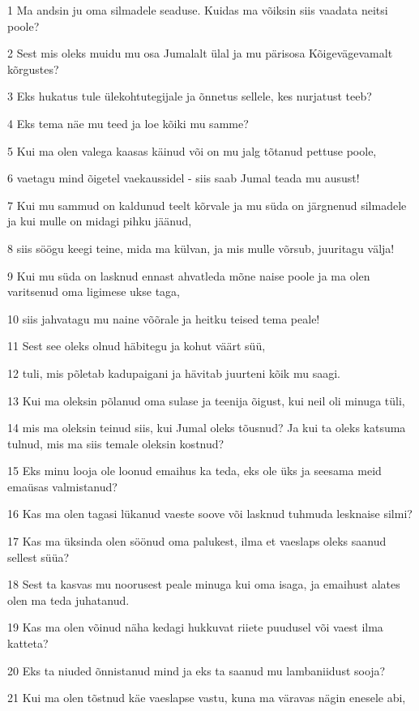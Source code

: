 \par 1 Ma andsin ju oma silmadele seaduse. Kuidas ma võiksin siis vaadata neitsi poole?
\par 2 Sest mis oleks muidu mu osa Jumalalt ülal ja mu pärisosa Kõigevägevamalt kõrgustes?
\par 3 Eks hukatus tule ülekohtutegijale ja õnnetus sellele, kes nurjatust teeb?
\par 4 Eks tema näe mu teed ja loe kõiki mu samme?
\par 5 Kui ma olen valega kaasas käinud või on mu jalg tõtanud pettuse poole,
\par 6 vaetagu mind õigetel vaekaussidel - siis saab Jumal teada mu ausust!
\par 7 Kui mu sammud on kaldunud teelt kõrvale ja mu süda on järgnenud silmadele ja kui mulle on midagi pihku jäänud,
\par 8 siis söögu keegi teine, mida ma külvan, ja mis mulle võrsub, juuritagu välja!
\par 9 Kui mu süda on lasknud ennast ahvatleda mõne naise poole ja ma olen varitsenud oma ligimese ukse taga,
\par 10 siis jahvatagu mu naine võõrale ja heitku teised tema peale!
\par 11 Sest see oleks olnud häbitegu ja kohut väärt süü,
\par 12 tuli, mis põletab kadupaigani ja hävitab juurteni kõik mu saagi.
\par 13 Kui ma oleksin põlanud oma sulase ja teenija õigust, kui neil oli minuga tüli,
\par 14 mis ma oleksin teinud siis, kui Jumal oleks tõusnud? Ja kui ta oleks katsuma tulnud, mis ma siis temale oleksin kostnud?
\par 15 Eks minu looja ole loonud emaihus ka teda, eks ole üks ja seesama meid emaüsas valmistanud?
\par 16 Kas ma olen tagasi lükanud vaeste soove või lasknud tuhmuda lesknaise silmi?
\par 17 Kas ma üksinda olen söönud oma palukest, ilma et vaeslaps oleks saanud sellest süüa?
\par 18 Sest ta kasvas mu noorusest peale minuga kui oma isaga, ja emaihust alates olen ma teda juhatanud.
\par 19 Kas ma olen võinud näha kedagi hukkuvat riiete puudusel või vaest ilma katteta?
\par 20 Eks ta niuded õnnistanud mind ja eks ta saanud mu lambaniidust sooja?
\par 21 Kui ma olen tõstnud käe vaeslapse vastu, kuna ma väravas nägin enesele abi,
